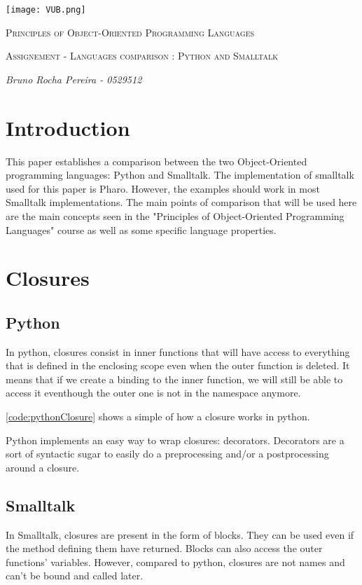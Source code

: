 \documentclass[12pt,a4paper]{scrartcl}
\begin{document}
\begin{titlepage}
    \centering
    \texttt{[image: VUB.png]}\par\vspace{1cm}
    {\scshape\Large Principles of Object-Oriented Programming Languages\par}
    \vspace{1cm}
    {\scshape\Large Assignement - Languages comparison : Python and Smalltalk\par}
    \vspace{1.5cm}
    {\Large\itshape Bruno Rocha Pereira - 0529512\par}
    \vfill
\end{titlepage}
\begin{multicols}{2}
\section{Introduction}
This paper establishes a comparison between the two Object-Oriented programming languages: Python and Smalltalk. The implementation of smalltalk used for this paper is Pharo. However, the examples should work in most Smalltalk implementations. The main points of comparison that will be used here are the main concepts seen in the "Principles of Object-Oriented Programming Languages" course as well as some specific language properties.


\section{Closures}
\subsection{Python}
In python, closures consist in inner functions that will have access to everything that is defined in the enclosing scope even when the outer function is deleted. It means that if we create a binding to the inner function, we will still be able to access it eventhough the outer one is not in the namespace anymore.

\ref{code:pythonClosure} shows a simple of how a closure works in python.

Python implements an easy way to wrap closures: decorators. Decorators are a sort of syntactic sugar to easily do a preprocessing and/or a postprocessing around a closure.


\subsection{Smalltalk}
In Smalltalk, closures are present in the form of blocks. They can be used even if the method defining them have returned. Blocks can also access the outer functions' variables. However, compared to python, closures are not names and can't be bound and called later.


\end{multicols}
\end{document}
